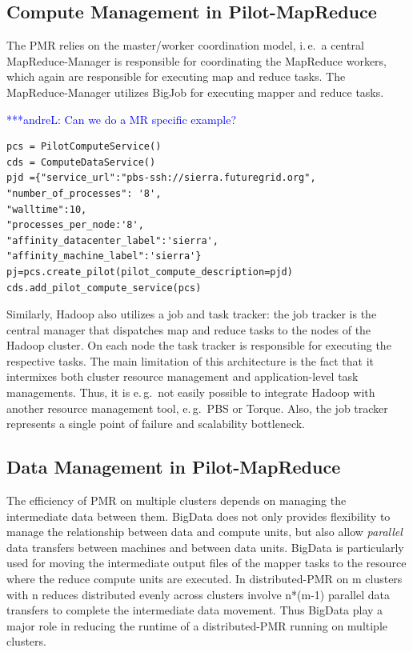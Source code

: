 \documentclass{acm_proc_article-sp}
\newcommand{\alnote}[1]{ {\textcolor{blue} { ***andreL: #1 }}}
\newcommand{\alnote}[1]{}
\newcommand{\pilotmapreduce}{Pilot-MapReduce\xspace}
\begin{document}
\subsection{Compute Management in \pilotmapreduce}
The PMR relies on the master/worker
coordination model, i.\,e.\ a central MapReduce-Manager is responsible for
coordinating the MapReduce workers, which again are responsible for executing
map and reduce tasks. The MapReduce-Manager utilizes BigJob for executing
mapper and reduce tasks. 

\alnote{Can we do a MR specific example?}

\lstset{
language=Python,
frame=single,
captionpos=b,
stringstyle=\ttfamily,
basicstyle=\scriptsize\ttfamily
}
\noindent\begin{minipage}{0.47 \textwidth}
\begin{lstlisting}[caption={\textbf{Pilot Compute Creation:} Instantiation of a Pilot Job using Pilot Compute Description}, label={lst:pcs_creation}]
pcs = PilotComputeService()
cds = ComputeDataService()
pjd ={"service_url":"pbs-ssh://sierra.futuregrid.org", 
"number_of_processes": '8',
"walltime":10, 
"processes_per_node:'8',
"affinity_datacenter_label":'sierra',
"affinity_machine_label":'sierra'}
pj=pcs.create_pilot(pilot_compute_description=pjd)
cds.add_pilot_compute_service(pcs)
\end{lstlisting}
\end{minipage}

Similarly, Hadoop also utilizes a job and task tracker: the job tracker is the
central manager that dispatches map and reduce tasks to the nodes of the
Hadoop cluster. On each node the task tracker is responsible for executing the
respective tasks. The main limitation of this architecture is the fact that it
intermixes both cluster resource management and application-level task
managements. Thus, it is e.\,g.\ not easily possible to integrate Hadoop with
another resource management tool, e.\,g.\ PBS or Torque. Also, the job tracker
represents a single point of failure and scalability bottleneck.

\subsection{Data Management in \pilotmapreduce}

The efficiency of PMR on multiple clusters depends on managing the intermediate data 
between them. BigData does not only provides flexibility to manage the
relationship between data and compute units, but also allow {\it parallel} data transfers
between machines and between data units. BigData is particularly used for moving the
intermediate output files of the mapper tasks to the resource where the reduce compute
units are executed. In distributed-PMR on m clusters with n reduces distributed
evenly across clusters involve n*(m-1) parallel data transfers to complete the intermediate
data movement. Thus BigData play a major role in reducing the runtime of a distributed-PMR running
on multiple clusters.
\end{document}
